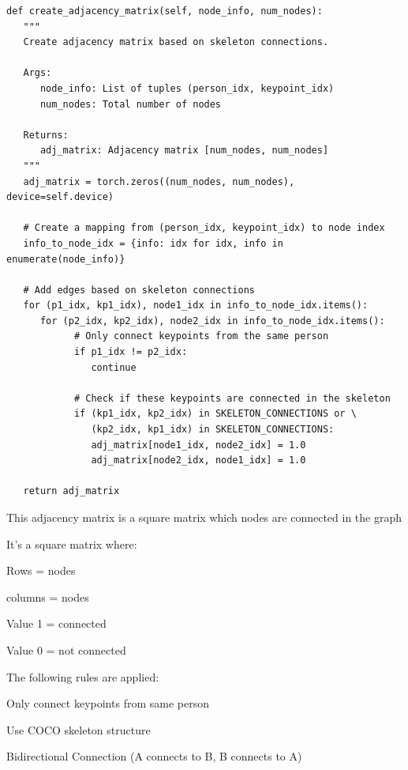 \begin{lstlisting}[style=pythonstyle,title={Preprocessing May Adjacency},label={code:preprocessing_may_adjacency_matrix}]
def create_adjacency_matrix(self, node_info, num_nodes):
   """
   Create adjacency matrix based on skeleton connections.
   
   Args:
      node_info: List of tuples (person_idx, keypoint_idx)
      num_nodes: Total number of nodes
      
   Returns:
      adj_matrix: Adjacency matrix [num_nodes, num_nodes]
   """
   adj_matrix = torch.zeros((num_nodes, num_nodes), device=self.device)
   
   # Create a mapping from (person_idx, keypoint_idx) to node index
   info_to_node_idx = {info: idx for idx, info in enumerate(node_info)}
   
   # Add edges based on skeleton connections
   for (p1_idx, kp1_idx), node1_idx in info_to_node_idx.items():
      for (p2_idx, kp2_idx), node2_idx in info_to_node_idx.items():
            # Only connect keypoints from the same person
            if p1_idx != p2_idx:
               continue
            
            # Check if these keypoints are connected in the skeleton
            if (kp1_idx, kp2_idx) in SKELETON_CONNECTIONS or \
               (kp2_idx, kp1_idx) in SKELETON_CONNECTIONS:
               adj_matrix[node1_idx, node2_idx] = 1.0
               adj_matrix[node2_idx, node1_idx] = 1.0
   
   return adj_matrix
\end{lstlisting}

This adjacency matrix is a square matrix which nodes are connected in the graph

It's a square matrix where:

\begin{compactitem}
   \item Rows = nodes
   \item columns = nodes
   \item Value 1 = connected
   \item Value 0 = not connected
\end{compactitem}

The following rules are applied:

\begin{compactitem}
   \item Only connect keypoints from same person
   \item Use COCO skeleton structure
   \item Bidirectional Connection (A connects to B, B connects to A)
\end{compactitem}

